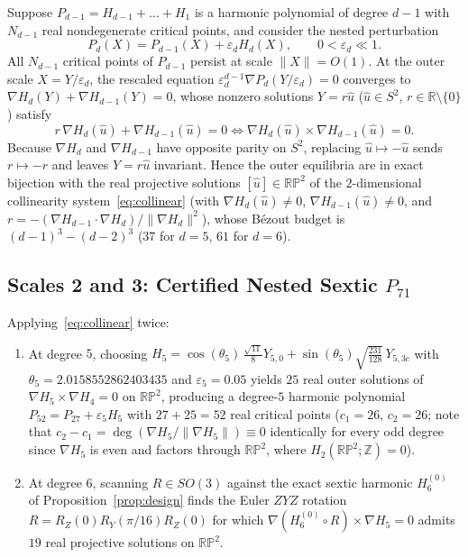 \documentclass[11pt,a4paper]{amsart}
\theoremstyle{definition}
\newcommand{\R}{\mathbb{R}}
\newcommand{\Z}{\mathbb{Z}}
\newcommand{\RP}{\mathbb{RP}}
\begin{document}
Suppose $P_{d-1} = H_{d-1} + \dots + H_1$ is a harmonic polynomial of degree
$d - 1$ with $N_{d-1}$ real nondegenerate critical points, and consider the
nested perturbation
\[
  P_d(X) = P_{d-1}(X) + \varepsilon_d H_d(X), \qquad 0 < \varepsilon_d \ll 1.
\]
All $N_{d-1}$ critical points of $P_{d-1}$ persist at scale $\|X\| = O(1)$.
At the outer scale $X = Y / \varepsilon_d$, the rescaled equation
$\varepsilon_d^{d-1} \nabla P_d(Y/\varepsilon_d) = 0$ converges to
$\nabla H_d(Y) + \nabla H_{d-1}(Y) = 0$, whose nonzero solutions $Y = r\hat{u}$
($\hat{u} \in S^2$, $r \in \R \setminus \{0\}$) satisfy
\begin{equation}\label{eq:collinear}
  r\,\nabla H_d(\hat{u}) + \nabla H_{d-1}(\hat{u}) = 0
  \iff \nabla H_d(\hat{u}) \times \nabla H_{d-1}(\hat{u}) = 0.
\end{equation}
Because $\nabla H_d$ and $\nabla H_{d-1}$ have opposite parity on $S^2$,
replacing $\hat{u} \mapsto -\hat{u}$ sends $r \mapsto -r$ and leaves
$Y = r\hat{u}$ invariant. Hence the outer equilibria are in exact bijection
with the real projective solutions $[\hat{u}] \in \RP^2$ of the $2$-dimensional
collinearity system~\eqref{eq:collinear} (with $\nabla H_d(\hat{u}) \ne 0$,
$\nabla H_{d-1}(\hat{u}) \ne 0$, and $r = -(\nabla H_{d-1}\cdot \nabla H_d)/\|\nabla H_d\|^2$),
whose B\'ezout budget is $(d-1)^3 - (d-2)^3$ ($37$ for $d = 5$, $61$ for
$d = 6$).

\subsection{Scales 2 and 3: Certified Nested Sextic $P_{71}$}

Applying~\eqref{eq:collinear} twice:
\begin{enumerate}
  \item At degree $5$, choosing
  $H_5 = \cos(\theta_5)\,\frac{\sqrt{11}}{8} Y_{5,0} + \sin(\theta_5)\sqrt{\frac{231}{128}}\,Y_{5,3c}$
  with $\theta_5 = 2.0158552862403435$ and $\varepsilon_5 = 0.05$ yields $25$
  real outer solutions of $\nabla H_5 \times \nabla H_4 = 0$ on $\RP^2$,
  producing a degree-$5$ harmonic polynomial $P_{52} = P_{27} + \varepsilon_5 H_5$
  with $27 + 25 = 52$ real critical points ($c_1 = 26$, $c_2 = 26$; note that
  $c_2 - c_1 = \deg(\nabla H_5/\|\nabla H_5\|) \equiv 0$ identically for every
  odd degree since $\nabla H_5$ is even and factors through $\RP^2$, where
  $H_2(\RP^2; \Z) = 0$).
  \item At degree $6$, scanning $R \in SO(3)$ against the exact sextic harmonic
  $H_6^{(0)}$ of Proposition~\ref{prop:design} finds the Euler $ZYZ$ rotation
  $R = R_Z(0) R_Y(\pi/16) R_Z(0)$ for which
  $\nabla(H_6^{(0)} \circ R) \times \nabla H_5 = 0$ admits $19$ real projective
  solutions on $\RP^2$.
\end{enumerate}
\end{document}
